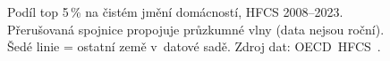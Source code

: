 \def\strEuBohatstviTopZOTitle{Podíl top 5\,\% domácností na čistém jmění}%
\def\strEuBohatstviTopZOXlabel{rok (\acs{HFCS} vlna)}%
\def\strEuBohatstviTopZOYlabel{podíl top 5\,\% domácností na čistém jmění [\%]}%
\def\strEuBohatstviTopZOCaption{Podíl top 5\,\% na čistém jmění domácností, HFCS 2008--2023. Přerušovaná spojnice propojuje průzkumné vlny (data nejsou roční). Šedé linie = ostatní země v~datové sadě. Zdroj dat: \acs{OECD}~\acs{HFCS}~\cite{oecd_hfcs_wealth_top5_PC}.}%
%
\begin{figure}[htbp]
  \centering
  \resizebox{0.95\linewidth}{!}{}
  \caption{\strEuBohatstviTopZOCaption}
  \label{fig:eu_bohatstvi_top20}
\end{figure}
